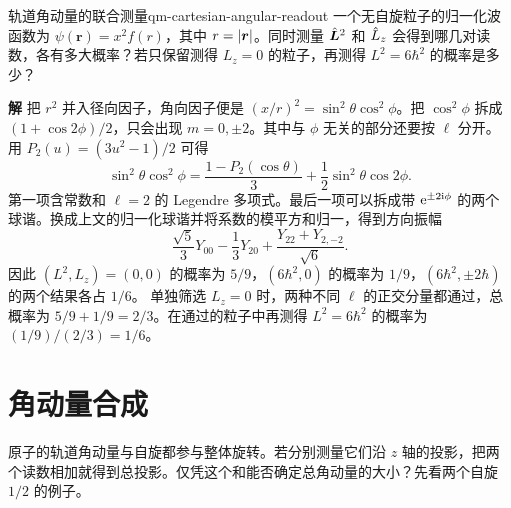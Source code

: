 \begin{example}{轨道角动量的联合测量}{qm-cartesian-angular-readout}
    一个无自旋粒子的归一化波函数为 $\psi(\bm r) = x^2 f(r)$，其中 $r = \lvert\bm r\rvert$。同时测量 $\hat{\bm{L}}^2$ 和 $\hat{L}_z$ 会得到哪几对读数，各有多大概率？若只保留测得 $L_z = 0$ 的粒子，再测得 $L^2 = 6\hbar^2$ 的概率是多少？
    \par\smallskip\textbf{解}\quad
    把 $r^2$ 并入径向因子，角向因子便是 $(x/r)^2 = \sin^2\theta\cos^2\phi$。把 $\cos^2\phi$ 拆成 $(1 + \cos 2\phi)/2$，只会出现 $m = 0,\pm2$。其中与 $\phi$ 无关的部分还要按 $\ell$ 分开。用 $P_2(u) = (3u^2 - 1)/2$ 可得
    \[
        \sin^2\theta\cos^2\phi
        = \frac{1 - P_2(\cos\theta)}{3} + \frac12\sin^2\theta\cos 2\phi .
    \]
    第一项含常数和 $\ell = 2$ 的 Legendre 多项式。最后一项可以拆成带 $\mathop{}\!\mathrm{e}^{\pm2\mathrm{i}\phi}$ 的两个球谐。换成上文的归一化球谐并将系数的模平方和归一，得到方向振幅
    \[
        \frac{\sqrt{5}}{3}Y_{00} - \frac13Y_{20}
        + \frac{Y_{22} + Y_{2,-2}}{\sqrt{6}} .
    \]
    因此 $(L^2,L_z) = (0,0)$ 的概率为 $5/9$，$(6\hbar^2,0)$ 的概率为 $1/9$，$(6\hbar^2,\pm2\hbar)$ 的两个结果各占 $1/6$。
    单独筛选 $L_z = 0$ 时，两种不同 $\ell$ 的正交分量都通过，总概率为 $5/9 + 1/9 = 2/3$。在通过的粒子中再测得 $L^2 = 6\hbar^2$ 的概率为 $(1/9)/(2/3) = 1/6$。
\end{example}

\section{角动量合成}
原子的轨道角动量与自旋都参与整体旋转。若分别测量它们沿 $z$ 轴的投影，把两个读数相加就得到总投影。仅凭这个和能否确定总角动量的大小？先看两个自旋 $1/2$ 的例子。

